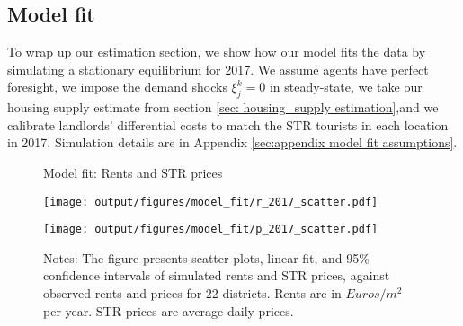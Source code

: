 \documentclass[11pt]{article}
\begin{document}
\subsection{Model fit}\label{sec: model fit}
To wrap up our estimation section, we show how our model fits the data by simulating a stationary equilibrium for 2017. We assume agents have perfect foresight, we impose the demand shocks $\xi^k_j=0$ in steady-state, we take our housing supply estimate from section \ref{sec: housing_supply estimation},and we calibrate landlords' differential costs to match the STR tourists in each location in 2017. Simulation details are in Appendix \ref{sec:appendix model fit assumptions}.

\begin{figure}[ht]
\centering
    \caption{Model fit: Rents and STR prices}\label{fig:model_fit}
    \begin{minipage}{0.475\textwidth}
    \centering
        \texttt{[image: output/figures/model\_fit/r\_2017\_scatter.pdf]}
    \end{minipage}%
    \begin{minipage}{0.475\textwidth}
    \centering
        \texttt{[image: output/figures/model\_fit/p\_2017\_scatter.pdf]}
    \end{minipage}
    \caption*{\footnotesize Notes: The figure presents scatter plots, linear fit, and 95\% confidence intervals of simulated rents and STR prices, against observed rents and prices for 22 districts. Rents are in $Euros/m^2$ per year. STR prices are average daily prices.}
\end{figure}
\end{document}
